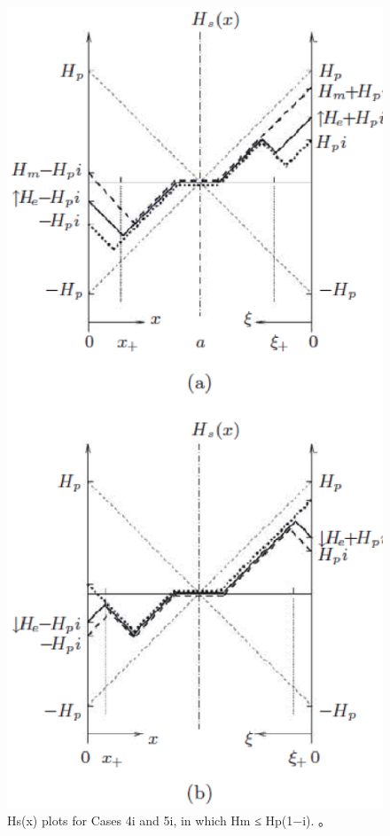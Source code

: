 \begin{figure}[htbp]
	\centering
	\includegraphics[scale=0.7]{chpt7/figs/fig7.15.eps}
	\caption{Hs(x) plots for Cases 4i and
		5i, in which Hm ≤ Hp(1−i). 。}
\end{figure}

